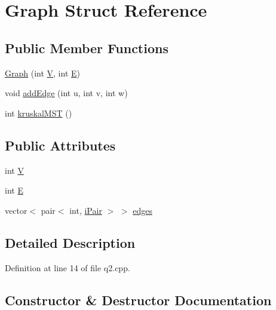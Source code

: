 \hypertarget{struct_graph}{}\section{Graph Struct Reference}
\label{struct_graph}
\subsection*{Public Member Functions}
\begin{DoxyCompactItemize}
\item 
\hyperlink{struct_graph_ad3b98f95ee53f91afad11b8eaddc35e0}{Graph} (int \hyperlink{struct_graph_a2b722f7cfa7a21e4cb5fae488b3d4dcc}{V}, int \hyperlink{struct_graph_a3ce250f958f7e96ffd9eb06780c21fbe}{E})
\item 
void \hyperlink{struct_graph_ab7b4b061fdba1d19a5fbcee110a319bd}{add\+Edge} (int u, int v, int w)
\item 
int \hyperlink{struct_graph_acec80ad3aef831280f7a05217270fb7b}{kruskal\+M\+ST} ()
\end{DoxyCompactItemize}
\subsection*{Public Attributes}
\begin{DoxyCompactItemize}
\item 
int \hyperlink{struct_graph_a2b722f7cfa7a21e4cb5fae488b3d4dcc}{V}
\item 
int \hyperlink{struct_graph_a3ce250f958f7e96ffd9eb06780c21fbe}{E}
\item 
vector$<$ pair$<$ int, \hyperlink{q2_8cpp_a18fc5862b3095bd9855a9e15c67b392d}{i\+Pair} $>$ $>$ \hyperlink{struct_graph_a6392aee9a6571dd07c19f9652ffeea5a}{edges}
\end{DoxyCompactItemize}


\subsection{Detailed Description}


Definition at line 14 of file q2.\+cpp.



\subsection{Constructor \& Destructor Documentation}
\mbox{\label{struct_graph_ad3b98f95ee53f91afad11b8eaddc35e0}} 
